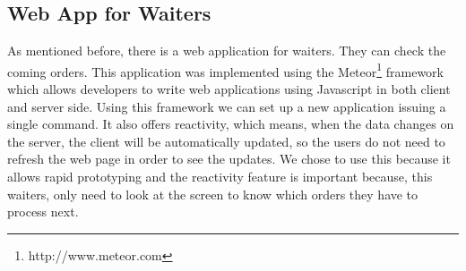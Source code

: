 \subsection{Web App for Waiters}
\label{sub:web_app_for_waiters}
As mentioned before, there is a web application for waiters. They can
check the coming orders.
This application was implemented using the
Meteor\footnote{http://www.meteor.com} framework which allows developers
to write web applications using Javascript in both client and server side.
Using this framework we can set up a new application issuing a single command.
It also offers reactivity, which means, when the data changes on the server,
the client will be automatically updated, so the users do not need to
refresh the web page in order to see the updates. We chose to use this
because it allows rapid prototyping and the reactivity feature is important
because, this waiters, only need to look at the screen to know which
orders they have to process next.
